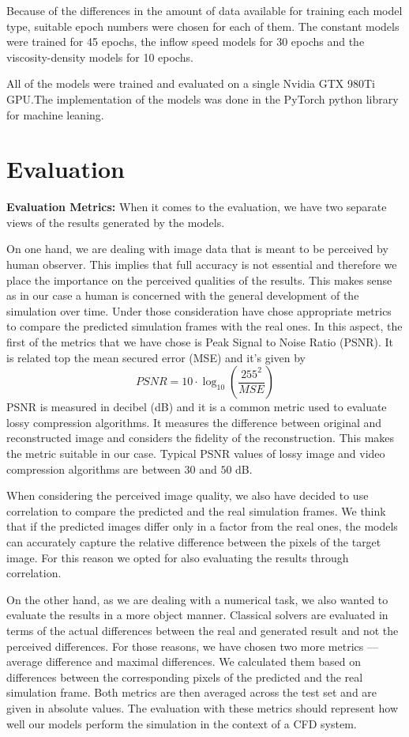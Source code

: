 \documentclass{llncs}
\begin{document}
Because of the differences in the amount of data available for training each model type, suitable epoch numbers were chosen for each of them. The constant models were trained for 45 epochs, the inflow speed models for 30 epochs and the viscosity-density models for 10 epochs.

All of the models were trained and evaluated on a single Nvidia GTX 980Ti GPU.\@ The implementation of the models was done in the PyTorch python library for machine leaning.

\section{Evaluation}\label{eval}

\noindent\textbf{Evaluation Metrics:} When it comes to the evaluation, we have two separate views of the results generated by the models.

On one hand, we are dealing with image data that is meant to be perceived by human observer. This implies that full accuracy is not essential and therefore we place the importance on the perceived qualities of the results. This makes sense as in our case a human is concerned with the general development of the simulation over time. Under those consideration have chose appropriate metrics to compare the predicted simulation frames with the real ones. In this aspect, the first of the metrics that we have chose is Peak Signal to Noise Ratio (PSNR). It is related top the mean secured error (MSE) and it's given by
\begin{equation}
PSNR = 10 \cdot \log_{10}\left(\frac{255^2}{MSE}\right)
\end{equation}
PSNR is measured in decibel (dB) and it is a common metric used to evaluate lossy compression algorithms. It measures the difference between original and reconstructed image and considers the fidelity of the reconstruction. This makes the metric suitable in our case. Typical PSNR values of lossy image and video compression  algorithms are between $30$ and $50$ dB.

When considering the perceived image quality, we also have decided to use correlation to compare the predicted and the real simulation frames. We think that if the predicted images differ only in a factor from the real ones, the models can accurately capture the relative difference between the pixels of the target image. For this reason we opted for also evaluating the results through correlation.

On the other hand, as we are dealing with a numerical task, we also wanted to evaluate the results in a more object manner. Classical solvers are evaluated in terms of the actual differences between the real and generated result and not the perceived differences. For those reasons, we have chosen two more metrics --- average difference and maximal differences. We calculated them based on differences between the corresponding pixels of the predicted and the real simulation frame. Both metrics are then averaged across the test set and are given in absolute values. The evaluation with these metrics should represent how well our models perform the simulation in the context of a CFD system.
\end{document}
